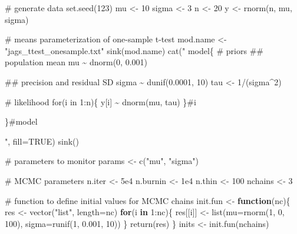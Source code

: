 \documentclass[
  13,
  letterpaper,
]{report}
\newenvironment{Shaded}{\begin{snugshade}}{\end{snugshade}}
\newcommand{\AttributeTok}[1]{\textcolor[rgb]{0.40,0.45,0.13}{#1}}
\newcommand{\CommentTok}[1]{\textcolor[rgb]{0.37,0.37,0.37}{#1}}
\newcommand{\ConstantTok}[1]{\textcolor[rgb]{0.56,0.35,0.01}{#1}}
\newcommand{\ControlFlowTok}[1]{\textcolor[rgb]{0.00,0.23,0.31}{\textbf{#1}}}
\newcommand{\DecValTok}[1]{\textcolor[rgb]{0.68,0.00,0.00}{#1}}
\newcommand{\FloatTok}[1]{\textcolor[rgb]{0.68,0.00,0.00}{#1}}
\newcommand{\FunctionTok}[1]{\textcolor[rgb]{0.28,0.35,0.67}{#1}}
\newcommand{\NormalTok}[1]{\textcolor[rgb]{0.00,0.23,0.31}{#1}}
\newcommand{\OtherTok}[1]{\textcolor[rgb]{0.00,0.23,0.31}{#1}}
\newcommand{\SpecialCharTok}[1]{\textcolor[rgb]{0.37,0.37,0.37}{#1}}
\newcommand{\StringTok}[1]{\textcolor[rgb]{0.13,0.47,0.30}{#1}}
\begin{document}
\begin{Shaded}
\begin{Highlighting}[]
\CommentTok{\# generate data}
\FunctionTok{set.seed}\NormalTok{(}\DecValTok{123}\NormalTok{)}
\NormalTok{mu }\OtherTok{\textless{}{-}} \DecValTok{10}
\NormalTok{sigma }\OtherTok{\textless{}{-}} \DecValTok{3}
\NormalTok{n }\OtherTok{\textless{}{-}} \DecValTok{20}
\NormalTok{y }\OtherTok{\textless{}{-}} \FunctionTok{rnorm}\NormalTok{(n, mu, sigma)}

\CommentTok{\# means parameterization of one{-}sample t{-}test}
\NormalTok{mod.name }\OtherTok{\textless{}{-}} \StringTok{"jags\_ttest\_onesample.txt"}
\FunctionTok{sink}\NormalTok{(mod.name)}
\FunctionTok{cat}\NormalTok{(}\StringTok{"}
\StringTok{    model\{}
\StringTok{        \# priors}
\StringTok{        \#\# population mean}
\StringTok{        mu \textasciitilde{} dnorm(0, 0.001)        }

\StringTok{        \#\# precision and residual SD}
\StringTok{        sigma \textasciitilde{} dunif(0.0001, 10)}
\StringTok{        tau \textless{}{-} 1/(sigma\^{}2)}

\StringTok{        \# likelihood}
\StringTok{        for(i in 1:n)\{}
\StringTok{            y[i] \textasciitilde{} dnorm(mu, tau)}
\StringTok{        \}\#i}

\StringTok{    \}\#model}

\StringTok{"}\NormalTok{, }\AttributeTok{fill=}\ConstantTok{TRUE}\NormalTok{)}
\FunctionTok{sink}\NormalTok{()}

\CommentTok{\# parameters to monitor}
\NormalTok{params }\OtherTok{\textless{}{-}} \FunctionTok{c}\NormalTok{(}\StringTok{"mu"}\NormalTok{, }\StringTok{"sigma"}\NormalTok{)}

\CommentTok{\# MCMC parameters}
\NormalTok{n.iter }\OtherTok{\textless{}{-}} \FloatTok{5e4}
\NormalTok{n.burnin }\OtherTok{\textless{}{-}} \FloatTok{1e4}
\NormalTok{n.thin }\OtherTok{\textless{}{-}} \DecValTok{100}
\NormalTok{nchains }\OtherTok{\textless{}{-}} \DecValTok{3}

\CommentTok{\# function to define initial values for MCMC chains}
\NormalTok{init.fun }\OtherTok{\textless{}{-}} \ControlFlowTok{function}\NormalTok{(nc)\{}
\NormalTok{    res }\OtherTok{\textless{}{-}} \FunctionTok{vector}\NormalTok{(}\StringTok{"list"}\NormalTok{, }\AttributeTok{length=}\NormalTok{nc)}
    \ControlFlowTok{for}\NormalTok{(i }\ControlFlowTok{in} \DecValTok{1}\SpecialCharTok{:}\NormalTok{nc)\{}
\NormalTok{        res[[i]] }\OtherTok{\textless{}{-}} \FunctionTok{list}\NormalTok{(}\AttributeTok{mu=}\FunctionTok{rnorm}\NormalTok{(}\DecValTok{1}\NormalTok{, }\DecValTok{0}\NormalTok{, }\DecValTok{100}\NormalTok{),}
                         \AttributeTok{sigma=}\FunctionTok{runif}\NormalTok{(}\DecValTok{1}\NormalTok{, }\FloatTok{0.001}\NormalTok{, }\DecValTok{10}\NormalTok{))}
\NormalTok{    \}}
    \FunctionTok{return}\NormalTok{(res)}
\NormalTok{\}}
\NormalTok{inits }\OtherTok{\textless{}{-}} \FunctionTok{init.fun}\NormalTok{(nchains)}


\end{Highlighting}
\end{Shaded}
\end{document}
